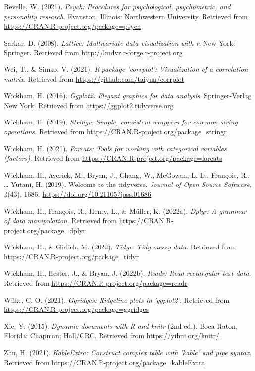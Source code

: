 \documentclass[
  english,
  man]{apa6}
\begin{document}
\leavevmode\hypertarget{ref-R-psych}{}%
Revelle, W. (2021). \emph{Psych: Procedures for psychological, psychometric, and personality research}. Evanston, Illinois: Northwestern University. Retrieved from \url{https://CRAN.R-project.org/package=psych}

\leavevmode\hypertarget{ref-R-lattice}{}%
Sarkar, D. (2008). \emph{Lattice: Multivariate data visualization with r}. New York: Springer. Retrieved from \url{http://lmdvr.r-forge.r-project.org}

\leavevmode\hypertarget{ref-R-corrplot2021}{}%
Wei, T., \& Simko, V. (2021). \emph{R package 'corrplot': Visualization of a correlation matrix}. Retrieved from \url{https://github.com/taiyun/corrplot}

\leavevmode\hypertarget{ref-R-ggplot2}{}%
Wickham, H. (2016). \emph{Ggplot2: Elegant graphics for data analysis}. Springer-Verlag New York. Retrieved from \url{https://ggplot2.tidyverse.org}

\leavevmode\hypertarget{ref-R-stringr}{}%
Wickham, H. (2019). \emph{Stringr: Simple, consistent wrappers for common string operations}. Retrieved from \url{https://CRAN.R-project.org/package=stringr}

\leavevmode\hypertarget{ref-R-forcats}{}%
Wickham, H. (2021). \emph{Forcats: Tools for working with categorical variables (factors)}. Retrieved from \url{https://CRAN.R-project.org/package=forcats}

\leavevmode\hypertarget{ref-R-tidyverse}{}%
Wickham, H., Averick, M., Bryan, J., Chang, W., McGowan, L. D., François, R., \ldots{} Yutani, H. (2019). Welcome to the tidyverse. \emph{Journal of Open Source Software}, \emph{4}(43), 1686. \url{https://doi.org/10.21105/joss.01686}

\leavevmode\hypertarget{ref-R-dplyr}{}%
Wickham, H., François, R., Henry, L., \& Müller, K. (2022a). \emph{Dplyr: A grammar of data manipulation}. Retrieved from \url{https://CRAN.R-project.org/package=dplyr}

\leavevmode\hypertarget{ref-R-tidyr}{}%
Wickham, H., \& Girlich, M. (2022). \emph{Tidyr: Tidy messy data}. Retrieved from \url{https://CRAN.R-project.org/package=tidyr}

\leavevmode\hypertarget{ref-R-readr}{}%
Wickham, H., Hester, J., \& Bryan, J. (2022b). \emph{Readr: Read rectangular text data}. Retrieved from \url{https://CRAN.R-project.org/package=readr}

\leavevmode\hypertarget{ref-R-ggridges}{}%
Wilke, C. O. (2021). \emph{Ggridges: Ridgeline plots in 'ggplot2'}. Retrieved from \url{https://CRAN.R-project.org/package=ggridges}

\leavevmode\hypertarget{ref-R-knitr}{}%
Xie, Y. (2015). \emph{Dynamic documents with R and knitr} (2nd ed.). Boca Raton, Florida: Chapman; Hall/CRC. Retrieved from \url{https://yihui.org/knitr/}

\leavevmode\hypertarget{ref-R-kableExtra}{}%
Zhu, H. (2021). \emph{KableExtra: Construct complex table with 'kable' and pipe syntax}. Retrieved from \url{https://CRAN.R-project.org/package=kableExtra}

\endgroup
\end{document}
